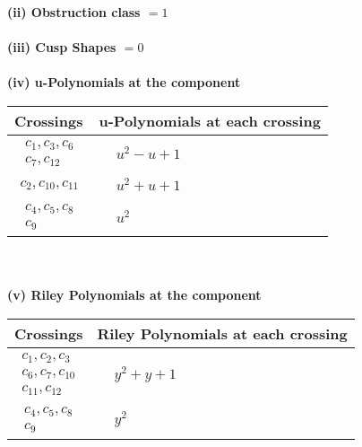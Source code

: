 \documentclass[1p]{elsarticle_modified}
\theoremstyle{definition}
\begin{document}
\flushleft \textbf{(ii) Obstruction class $= 1$}\\~\\
\flushleft \textbf{(iii) Cusp Shapes $= 0$}\\~\\
\newpage\renewcommand{\arraystretch}{1}
\flushleft \textbf{(iv) u-Polynomials at the component}\newline \\
\begin{tabular}{m{50pt}|m{274pt}}
Crossings & \hspace{64pt}u-Polynomials at each crossing \\
\hline $$\begin{aligned}c_{1},c_{3},c_{6}\\c_{7},c_{12}\end{aligned}$$&$\begin{aligned}
&u^2- u+1
\end{aligned}$\\
\hline $$\begin{aligned}c_{2},c_{10},c_{11}\end{aligned}$$&$\begin{aligned}
&u^2+u+1
\end{aligned}$\\
\hline $$\begin{aligned}c_{4},c_{5},c_{8}\\c_{9}\end{aligned}$$&$\begin{aligned}
&u^2
\end{aligned}$\\
\hline
\end{tabular}\\~\\
\newpage\renewcommand{\arraystretch}{1}
\flushleft \textbf{(v) Riley Polynomials at the component}\newline \\
\begin{tabular}{m{50pt}|m{274pt}}
Crossings & \hspace{64pt}Riley Polynomials at each crossing \\
\hline $$\begin{aligned}c_{1},c_{2},c_{3}\\c_{6},c_{7},c_{10}\\c_{11},c_{12}\end{aligned}$$&$\begin{aligned}
&y^2+y+1
\end{aligned}$\\
\hline $$\begin{aligned}c_{4},c_{5},c_{8}\\c_{9}\end{aligned}$$&$\begin{aligned}
&y^2
\end{aligned}$\\
\hline
\end{tabular}\\~\\
\end{document}
